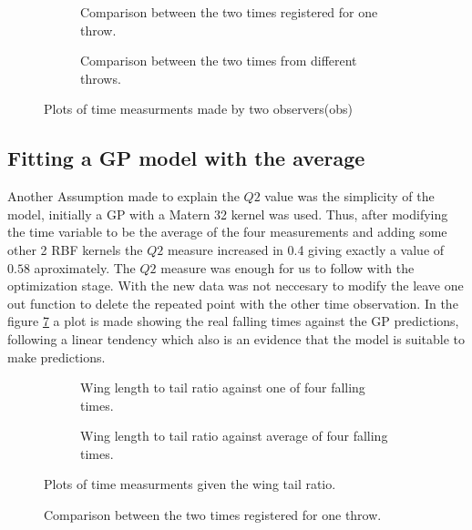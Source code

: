 \begin{figure}
	\begin{subfigure}[h]{.5\linewidth}
		
		\caption{Comparison between the two times registered for one throw.}
		\label{fig_EX1_EX1}
	\end{subfigure}
	\begin{subfigure}[h]{.5\linewidth}
		
		\caption{Comparison between the two times from different throws.}
		\label{fig_EX1_EX2}
	\end{subfigure}
	\caption{Plots of time measurments made by two observers(obs)}
\end{figure}

\subsection{Fitting a GP model with the average}

Another Assumption made to explain the $Q2$ value was the simplicity of the model, initially a GP with a Matern 32 kernel was used. Thus, after modifying the time variable to be the average of the four measurements and adding some other 2 RBF kernels the $Q2$ measure increased in 0.4 giving exactly a value of $0.58$ aproximately. The $Q2$ measure was enough for us to follow with the optimization stage. With the new data was not neccesary to modify the leave one out function to delete the repeated point with the other time observation. In the figure \ref{mloo_vs_real} a plot is made showing the real falling times against the GP predictions, following a linear tendency which also is an evidence that the model is suitable to make predictions.


\begin{figure}
	\begin{subfigure}[h]{.5\linewidth}
		
		\caption{Wing length to tail ratio against one of four falling times.}
		\label{fig_wtr_vs_obs2}
	\end{subfigure}
	\begin{subfigure}[h]{.5\linewidth}
		
		\caption{Wing length to tail ratio against average of four falling times.}
		\label{fig_wtr_vs_avg4}
	\end{subfigure}
	\caption{Plots of time measurments given the wing tail ratio.}
\end{figure}

\begin{figure}[h]
	\centering
	
	\caption{Comparison between the two times registered for one throw.}
	\label{mloo_vs_real}
\end{figure}
